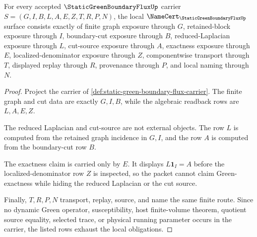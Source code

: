 \begin{theorem}
\label{thm:static-green-boundary-flux-namecert-obligations}
For every accepted $\StaticGreenBoundaryFluxUp$ carrier $S=(G,I,B,L,A,E,Z,T,R,P,N)$, the local $\NameCert_{\StaticGreenBoundaryFluxUp}$ surface consists exactly of finite graph exposure through $G$, retained-block exposure through $I$, boundary-cut exposure through $B$, reduced-Laplacian exposure through $L$, cut-source exposure through $A$, exactness exposure through $E$, localized-denominator exposure through $Z$, componentwise transport through $T$, displayed replay through $R$, provenance through $P$, and local naming through $N$.
\end{theorem}
\begin{proof}
Project the carrier of \autoref{def:static-green-boundary-flux-carrier}. The finite graph and cut data are exactly $G,I,B$, while the algebraic readback rows are $L,A,E,Z$.

The reduced Laplacian and cut-source are not external objects. The row $L$ is computed from the retained graph incidence in $G,I$, and the row $A$ is computed from the boundary-cut row $B$.

The exactness claim is carried only by $E$. It displays $L\mathbf{1}_I=A$ before the localized-denominator row $Z$ is inspected, so the packet cannot claim Green-exactness while hiding the reduced Laplacian or the cut source.

Finally, $T,R,P,N$ transport, replay, source, and name the same finite route. Since no dynamic Green operator, susceptibility, host finite-volume theorem, quotient source equality, selected trace, or physical running parameter occurs in the carrier, the listed rows exhaust the local obligations.
\end{proof}

